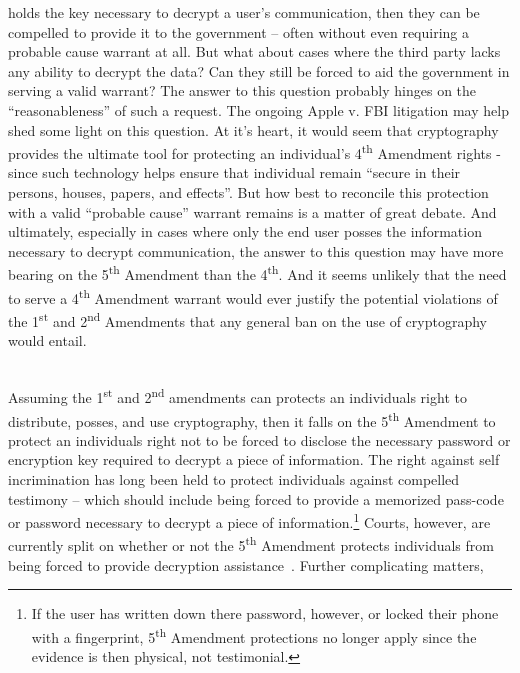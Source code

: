 \begin{packed_desc}
  holds the key necessary to decrypt a user's communication, then they
  can be compelled to provide it to the government -- often without
  even requiring a probable cause warrant at all. But what about cases
  where the third party lacks any ability to decrypt the data? Can
  they still be forced to aid the government in serving a valid
  warrant?  The answer to this question probably hinges on the
  ``reasonableness'' of such a request. The ongoing Apple v. FBI
  litigation may help shed some light on this question. At it's heart,
  it would seem that cryptography provides the ultimate tool for
  protecting an individual's 4\textsuperscript{th} Amendment rights -
  since such technology helps ensure that individual remain ``secure
  in their persons, houses, papers, and effects''. But how best to
  reconcile this protection with a valid ``probable cause'' warrant
  remains is a matter of great debate. And ultimately, especially in
  cases where only the end user posses the information necessary to
  decrypt communication, the answer to this question may have more
  bearing on the 5\textsuperscript{th} Amendment than the
  4\textsuperscript{th}. And it seems unlikely that the need to serve
  a 4\textsuperscript{th} Amendment warrant would ever justify the
  potential violations of the 1\textsuperscript{st} and
  2\textsuperscript{nd} Amendments that any general ban on the use of
  cryptography would entail.
\item[5\textsuperscript{th} Amendment] \hfill \\ Assuming the
  1\textsuperscript{st} and 2\textsuperscript{nd} amendments can
  protects an individuals right to distribute, posses, and use
  cryptography, then it falls on the 5\textsuperscript{th} Amendment
  to protect an individuals right not to be forced to disclose the
  necessary password or encryption key required to decrypt a piece of
  information. The right against self incrimination has long been held
  to protect individuals against compelled testimony -- which should
  include being forced to provide a memorized pass-code or password
  necessary to decrypt a piece of information.\footnote{If the user
    has written down there password, however, or locked their phone
    with a fingerprint, 5\textsuperscript{th} Amendment protections no
    longer apply since the evidence is then physical, not
    testimonial.}  Courts, however, are currently split on whether or
  not the 5\textsuperscript{th} Amendment protects individuals from
  being forced to provide decryption assistance~\cite{usvboucher,
    commonwealthvgelfgatt, usvdoe}. Further complicating matters,

\end{packed_desc}
